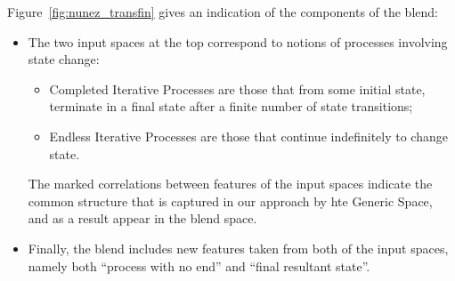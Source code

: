 Figure~\ref{fig:nunez_transfin} gives an indication of the components
of the blend:
\begin{itemize}
\item The two input spaces at the top correspond to notions
of processes involving state change:
\begin{itemize}
\item  Completed Iterative Processes
are those that from some initial state, terminate in a final state
after a finite number of state transitions;
\item 
Endless Iterative Processes are those that continue indefinitely
to change state.
\end{itemize}
The marked correlations between features of the input spaces
indicate the common structure that is captured in our approach
by hte Generic Space, and as a result appear in the blend space.
\item 
Finally, the blend includes new features taken from both of the
input spaces, namely both ``process with no end'' and 
``final resultant state''.
\end{itemize}


